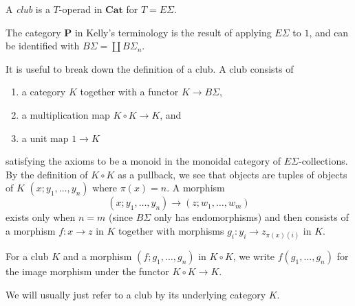 \documentclass{amsbook} %
\newcommand{\mb}{\mathbf}
\numberwithin{section}{chapter}
\begin{document}
\begin{Defi}
A \textit{club} is a $T$-operad in $\mb{Cat}$ for $T = E\Sigma$.
\end{Defi}

\begin{rem}
The category $\mb{P}$ in Kelly's terminology is the result of applying $E\Sigma$ to $1$, and can be identified with $B\Sigma = \coprod B\Sigma_{n}$.
\end{rem}

It is useful to break down the definition of a club.  A club consists of
\begin{enumerate}
\item a category $K$ together with a functor $K \rightarrow B \Sigma$,
\item a multiplication map $K \circ K \rightarrow K$, and
\item a unit map $1 \rightarrow K$
\end{enumerate}
satisfying the axioms to be a monoid in the monoidal category of $E\Sigma$-collections.  By the definition of $K \circ K$ as a pullback, we see that objects are tuples of objects of $K$ $(x; y_{1}, \ldots, y_{n})$ where $\pi(x) = n$.  A morphism
\[
(x; y_{1}, \ldots, y_{n}) \to (z; w_{1}, \ldots, w_{m})
\]
exists only when $n=m$ (since $B\Sigma$ only has endomorphisms) and then consists of a morphism $f:x \to z$ in $K$ together with morphisms $g_{i}:y_{i} \to z_{\pi(x)(i)}$ in $K$.

\begin{nota}\label{nota:clubmult}
For a club $K$ and a morphism $(f; g_{1}, \ldots, g_{n})$ in $K \circ K$, we write $f(g_{1}, \ldots, g_{n})$ for the image morphism under the functor $K \circ K \rightarrow K$.
\end{nota}

We will usually just refer to a club by its underlying category $K$.
\end{document}
